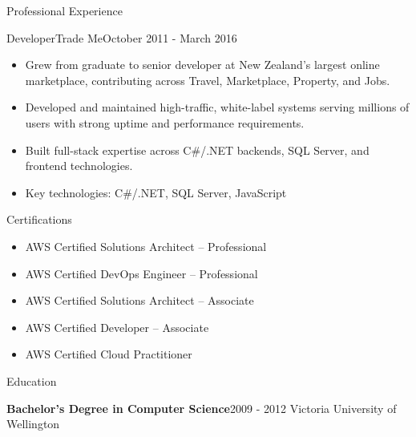 \documentclass{mcdowellcv}
\begin{document}
\begin{cvsection}{Professional Experience}
    \begin{cvsubsection}{Developer}{Trade Me}{October 2011 - March 2016}
        \begin{itemize}
            \item Grew from graduate to senior developer at New Zealand's largest online marketplace, contributing across Travel, Marketplace, Property, and Jobs.
            \item Developed and maintained high-traffic, white-label systems serving millions of users with strong uptime and performance requirements.
            \item Built full-stack expertise across C\#/.NET backends, SQL Server, and frontend technologies.
            \item Key technologies: C\#/.NET, SQL Server, JavaScript
        \end{itemize}
    \end{cvsubsection}
\end{cvsection}

\begin{cvsection}{Certifications}
    \begin{cvsubsection}{}{}{}
        \begin{itemize}
            \item AWS Certified Solutions Architect – Professional
            \item AWS Certified DevOps Engineer – Professional
            \item AWS Certified Solutions Architect – Associate
            \item AWS Certified Developer – Associate
            \item AWS Certified Cloud Practitioner
        \end{itemize}
    \end{cvsubsection}
\end{cvsection}

\begin{cvsection}{Education}
    \begin{cvsubsection}{}{}{}
        \textbf{Bachelor's Degree in Computer Science}\hspace*{\fill}2009 - 2012\newline
        Victoria University of Wellington
    \end{cvsubsection}
\end{cvsection}
\end{document}

